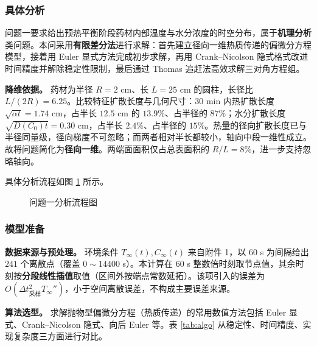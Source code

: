 \subsubsection{具体分析}
问题一要求给出预热平衡阶段药材内部温度与水分浓度的时空分布，属于\textbf{机理分析}类问题。本问采用\textbf{有限差分法}进行求解：首先建立径向一维热质传递的偏微分方程模型，接着用 Euler 显式方法完成初步求解，再用 Crank--Nicolson 隐式格式改进时间精度并解除稳定性限制，最后通过 Thomas 追赶法高效求解三对角方程组。

\textbf{降维依据。} 药材为半径 $R=2$ cm、长 $L=25$ cm 的圆柱，长径比 $L/(2R)=6.25$。比较特征扩散长度与几何尺寸：$30$ min 内热扩散长度 $\sqrt{\alpha t}=1.74$ cm，占半长 $12.5$ cm 的 $13.9\%$、占半径的 $87\%$；水分扩散长度 $\sqrt{D(C_0)t}=0.30$ cm，占半长 $2.4\%$、占半径的 $15\%$。热量的径向扩散长度已与半径同量级，径向梯度不可忽略；而两者相对半长都较小，轴向中段一维性成立。故将问题简化为\textbf{径向一维}。两端面面积仅占总表面积的 $R/L=8\%$，进一步支持忽略轴向。

具体分析流程如图 \ref{fig:flow} 所示。

\begin{figure}[H]
  \centering
  \caption{问题一分析流程图}
  \label{fig:flow}
\end{figure}

\subsubsection{模型准备}
\textbf{数据来源与预处理。} 环境条件 $T_\infty(t),C_\infty(t)$ 来自附件 1，以 $60$ s 为间隔给出 $241$ 个离散点（覆盖 $0\sim14400$ s）。本计算在 $60$ s 整数倍时刻取节点值，其余时刻按\textbf{分段线性插值}取值（区间外按端点常数延拓）。该项引入的误差为 $O(\Delta t_{\text{采样}}^2 T_\infty'')$，小于空间离散误差，不构成主要误差来源。

\textbf{算法选型。} 求解抛物型偏微分方程（热质传递）的常用数值方法包括 Euler 显式、Crank--Nicolson 隐式、向后 Euler 等。表 \ref{tab:algo} 从稳定性、时间精度、实现复杂度三方面进行对比。

